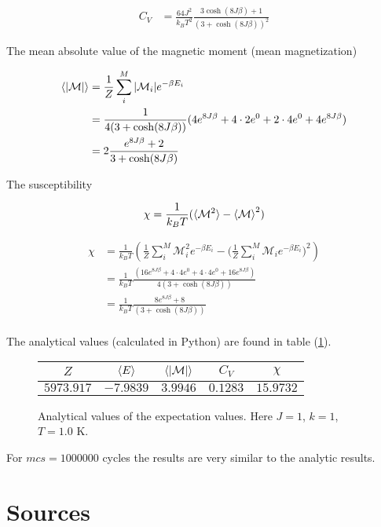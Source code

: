 \documentclass[11pt]{article}
\begin{document}
\begin{flushleft}
\begin{align*}
C_V &= \frac{64J^2}{k_B T^2}
\frac{3\cosh (8J \beta) + 1}{ (3 + \cosh (8 J \beta))^2}
\end{align*}


The mean absolute value of the magnetic moment (mean magnetization)

\begin{align*}
\braket{|\mathcal{M}|} 
&= \frac{1}{Z} \sum_i^M |\mathcal{M}_i| e^{- \beta E_i}\\
&= \frac{1}{4(3 + \cosh (8 J \beta))} (4e^{8J \beta} + 4 \cdot 2 e^0 + 2 \cdot 4 e^0 +4 e^{8 J \beta})\\
& =2 \frac{e^{8J \beta} + 2 }{3 + \cosh (8 J \beta)} \\
\end{align*}



The susceptibility

\begin{equation}
\chi = \frac{1}{k_B T} (\braket{\mathcal{M}^2} - \braket{\mathcal{M}}^2)
\end{equation}

\begin{align*}
\chi &= \frac{1}{k_B T} (\frac{1}{Z} \sum_i^M \mathcal{M}_i^2 e^{- \beta E_i}- \Big(\frac{1}{Z} \sum_i^M \mathcal{M}_i e^{- \beta E_i}\Big)^2)\\
&= \frac{1}{k_B T} 
\frac{(16e^{8J \beta} + 4 \cdot 4 e^0 + 4 \cdot 4 e^0 + 16 e^{8J \beta})}{4(3 + \cosh (8 J \beta))} \\
&= \frac{1}{k_B T} 
\frac{8e^{8J \beta} +8}{(3 + \cosh (8 J \beta))} \\
\end{align*}

\end{flushleft}

\begin{flushleft}
The analytical values (calculated in Python) are found in table (\ref{fig:: analytical}).

\begin{figure}[h]
\label{fig:: analytical}
\centering
\begin{tabular}{|c|c|c|c|c|}
\hline
$Z$ &$\braket{E}$ & $\braket{|\mathcal{M}|}$ & $C_V$ & $\chi$\\
\hline
$5973.917$ & $-7.9839$ & $3.9946$ & $0.1283$ & $15.9732$\\
\hline
\end{tabular}
\caption{Analytical values of the expectation values. Here $J=1$, $k=1$, $T=1.0$ K.}
\end{figure}
\end{flushleft}

\begin{flushleft}
For $mcs = 1000000$ cycles the results are very similar to the analytic results. 
\end{flushleft}

\section{Sources}
\end{document}
